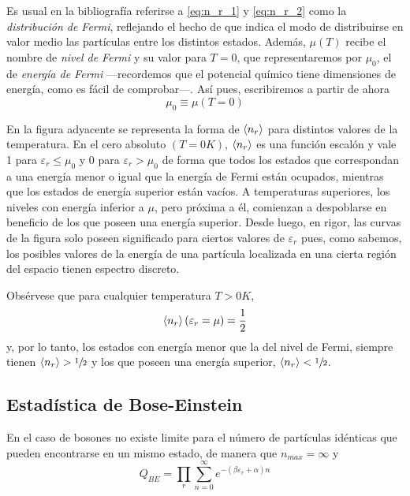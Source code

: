 Es usual en la bibliografía referirse a \eqref{eq:n_r_1} y \eqref{eq:n_r_2} como la \emph{distribución de Fermi}, reflejando el hecho de que indica el modo de distribuirse en valor medio las partículas entre los distintos estados.
Además, $\mu (T)$ recibe el nombre de \emph{nivel de Fermi} y su valor para $T = 0$, que representaremos por $\mu_0$, el de \emph{energía de Fermi} ---recordemos que el potencial químico tiene dimensiones de energía, como es fácil de comprobar---.
Así pues, escribiremos a partir de ahora
$$\mu_0 \equiv \mu(T=0)$$

\begin{wrapfigure}{r}{0.4\textwidth}
	\centering
	\hspace{3.5cm}
	
	\vspace{-0.5cm}
\end{wrapfigure}
En la figura adyacente se representa la forma de $\expval{n_r}$ para distintos valores de la temperatura.
En el cero absoluto $(T = 0K)$, $\expval{n_r}$ es una función escalón y vale 1 para $\varepsilon_r \leq \mu_0$ y 0 para $\varepsilon_r > \mu_0$ de forma que todos los estados que correspondan a una energía menor o igual que la energía de Fermi están ocupados, mientras que los estados de energía superior están vacíos.
A temperaturas superiores, los niveles con energía inferior a $\mu$, pero próxima a él, comienzan a despoblarse en beneficio de los que poseen una energía superior.
Desde luego, en rigor, las curvas de la figura solo poseen significado para ciertos valores de $\varepsilon_r$ pues, como sabemos, los posibles valores de la energía de una partícula localizada en una cierta región del espacio tienen espectro discreto.

Obsérvese que para cualquier temperatura $T > 0 K$,
\begin{equation}
	\expval{n_r} (\varepsilon_r = \mu )= \frac{1}{2}
\end{equation}
y, por lo tanto, los estados con energía menor que la del nivel de Fermi, siempre tienen $\expval{n_r} > \sfrac{1}{2}$ y los que poseen una energía superior, $\expval{n_r} < \sfrac{1}{2}$.

\subsection*{Estadística de Bose-Einstein}

En el caso de bosones no existe limite para el número de partículas idénticas que pueden encontrarse en un mismo estado, de manera que $n_{max} = \infty$ y
\begin{equation}
	Q_{BE} = \prod_r \sum_{n=0}^{\infty} e^{-(\beta\varepsilon_r + \alpha) n}
\end{equation}

